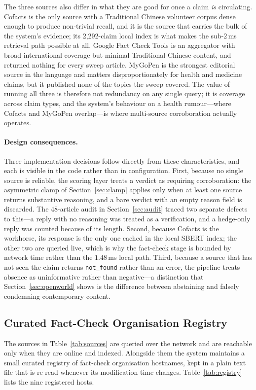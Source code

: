 \documentclass[twoside]{llncs}
\begin{document}
The three sources also differ in what they are good for once a claim \emph{is} circulating. Cofacts is the only source with a Traditional Chinese volunteer corpus dense enough to produce non-trivial recall, and it is the source that carries the bulk of the system's evidence; its 2,292-claim local index is what makes the sub-$2$\,ms retrieval path possible at all. Google Fact Check Tools is an aggregator with broad international coverage but minimal Traditional Chinese content, and returned nothing for every sweep article. MyGoPen is the strongest editorial source in the language and matters disproportionately for health and medicine claims, but it published none of the topics the sweep covered. The value of running all three is therefore not redundancy on any single query; it is coverage across claim types, and the system's behaviour on a health rumour---where Cofacts and MyGoPen overlap---is where multi-source corroboration actually operates.

\paragraph{Design consequences.}
Three implementation decisions follow directly from these characteristics, and each is visible in the code rather than in configuration. First, because no single source is reliable, the scoring layer treats a verdict as requiring corroboration: the asymmetric clamp of Section~\ref{sec:clamp} applies only when at least one source returns substantive reasoning, and a bare verdict with an empty reason field is discarded. The $48$-article audit in Section~\ref{sec:audit} traced two separate defects to this---a reply with no reasoning was treated as a verification, and a hedge-only reply was counted because of its length. Second, because Cofacts is the workhorse, its response is the only one cached in the local SBERT index; the other two are queried live, which is why the fact-check stage is bounded by network time rather than the $1.48$\,ms local path. Third, because a source that has not seen the claim returns \texttt{not\_found} rather than an error, the pipeline treats absence as uninformative rather than negative---a distinction that Section~\ref{sec:openworld} shows is the difference between abstaining and falsely condemning contemporary content.

\subsection{Curated Fact-Check Organisation Registry}
\label{sec:registry}
The sources in Table~\ref{tab:sources} are queried over the network and are reachable only when they are online and indexed. Alongside them the system maintains a small curated registry of fact-check organisation hostnames, kept in a plain text file that is re-read whenever its modification time changes. Table~\ref{tab:registry} lists the nine registered hosts.
\end{document}
